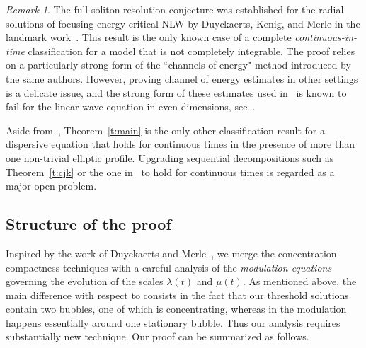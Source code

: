 \documentclass[10pt,reqno]{amsart}
\numberwithin{equation}{section}
\theoremstyle{remark}
\newtheorem{rem}[thm]{Remark}
\newcommand{\0}{\emptyset}
\begin{document}
\begin{rem}\label{r:dkm} 
The full soliton resolution conjecture was established for the radial solutions of focusing energy critical NLW by Duyckaerts, Kenig, and Merle in the landmark work~\cite{DKM4}. This result is the only known case of a complete \emph{continuous-in-time} classification for a model
that is not completely integrable.   The proof relies on a particularly strong  form of the ``channels of energy" method introduced by the same authors. However, proving channel of energy estimates in other settings  is a delicate issue, and the strong form of these estimates used in~\cite{DKM4} is known to fail for the linear wave equation in even dimensions, see~\cite{CKS}.

Aside from~\cite{DKM4}, Theorem~\ref{t:main} is the only other classification result for a dispersive equation that holds for continuous times in the presence of more than one non-trivial elliptic profile. Upgrading sequential decompositions such as Theorem~\ref{t:cjk} or the one in~\cite{DJKM1} to hold for continuous times is regarded as a major open problem. %

%
 \end{rem}
 
 
 

 \subsection{Structure of the proof}
 Inspired by the work of Duyckaerts and Merle~\cite{DM},
 we merge the concentration-compactness techniques
 with a careful analysis of the \emph{modulation equations} governing the evolution
 of the scales $\lambda(t)$ and $\mu(t)$.  As mentioned above,
 the main difference with respect to \cite{DM} consists in the fact that
 our threshold solutions contain two bubbles, one of which is concentrating,
 whereas in \cite{DM} the modulation happens essentially around one stationary bubble. Thus our analysis requires substantially new technique. 
 Our proof can be summarized as follows.
 
\end{document}
